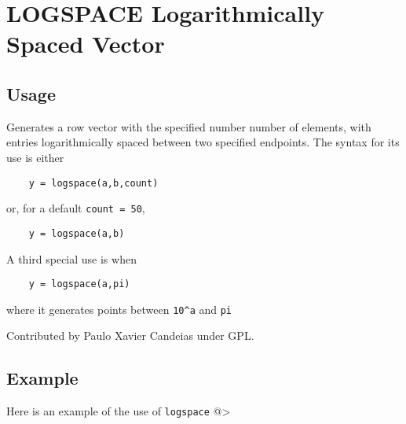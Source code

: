 \section{LOGSPACE Logarithmically Spaced Vector}

\subsection{Usage}

Generates a row vector with the specified number number of elements,
with entries logarithmically spaced between two specified endpoints.
The syntax for its use is either
\begin{verbatim}
    y = logspace(a,b,count)
\end{verbatim}
 or, for a default \verb|count = 50|,
\begin{verbatim}
    y = logspace(a,b)
\end{verbatim}
 A third special use is when
\begin{verbatim}
    y = logspace(a,pi)
\end{verbatim}
where it generates points between \verb|10^a| and \verb|pi|

Contributed by Paulo Xavier Candeias under GPL.
\subsection{Example}

Here is an example of the use of \verb|logspace|
@>
